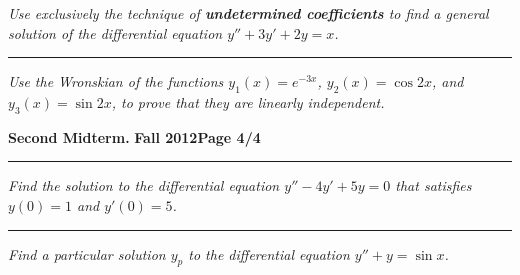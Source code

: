 \documentclass[12pt]{article}
\begin{document}
\bigskip
{\problem[20 pts] \em Use exclusively the technique of
\textbf{undetermined coefficients} to find a general solution of the
differential equation $y''+3y'+2y=x$.}
\vspace{11cm}
\begin{flushright}
\end{flushright}
\hrule
{\problem[10pts] \em Use the Wronskian of the functions $y_1(x)=e^{-3x}$,
$y_2(x)=\cos 2x$, and $y_3(x)=\sin 2x$, to prove that they are linearly
independent.}
\vspace{6cm}
\begin{flushright}
\end{flushright}
\newpage

\hfill{\large\bf Second Midterm.}\hfill{\large\bf
  Fall 2012}\hfill{\large\bf Page 4/4}\hrule

\bigskip
{\problem[15 pts] \em Find the solution to the differential equation
$y''-4y'+5y=0$ that satisfies $y(0)=1$ and $y'(0)=5$.}
\vspace{6cm}
\begin{flushright}
\end{flushright}
\hrule
{\problem[20] \em Find a particular solution $y_p$ to the differential
equation $y''+y=\sin x$.}
\vspace{11.5cm}
\begin{flushright}
\end{flushright}
\end{document}
